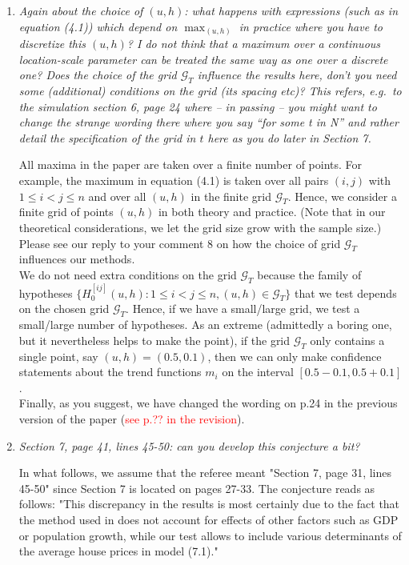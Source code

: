 \documentclass[a4paper,12pt]{article}
\begin{document}
\begin{enumerate}[label=\arabic*.,leftmargin=0.6cm]
\item \textit{Again about the choice of $(u, h)$: what happens with expressions (such as in equation (4.1)) which depend on $\max_{(u,h)}$ in practice where you have to discretize this $(u, h)$? I do not think that a maximum over a continuous location-scale parameter can be treated the same way as one over a discrete one? Does the choice of the grid $\mathcal{G}_T$ influence the results here, don't you need some (additional) conditions on the grid (its spacing etc)? This refers, e.g.\ to the simulation section 6, page 24 where -- in passing -- you might want to change the strange wording there where you say ``for some t in N'' and rather detail the specification of the grid in $t$ here as you do later in Section 7.}  

All maxima in the paper are taken over a finite number of points. For example, the maximum in equation (4.1) is taken over all pairs $(i,j)$ with $1 \le i < j \le n$ and over all $(u,h)$ in the finite grid $\mathcal{G}_T$. Hence, we consider a finite grid of points $(u,h)$ in both theory and practice. (Note that in our theoretical considerations, we let the grid size grow with the sample size.) \\
Please see our reply to your comment 8 on how the choice of grid $\mathcal{G}_T$ influences our methods. \\
We do not need extra conditions on the grid $\mathcal{G}_T$ because the family of hypotheses $\{H_0^{[ij]}(u,h): 1 \le i < j \le n, (u,h) \in \mathcal{G}_T \}$ that we test depends on the chosen grid $\mathcal{G}_T$. Hence, if we have a small/large grid, we test a small/large number of hypotheses. As an extreme (admittedly a boring one, but it nevertheless helps to make the point), if the grid $\mathcal{G}_T$ only contains a single point, say $(u,h) = (0.5, 0.1)$, then we can only make confidence statements about the trend functions $m_i$ on the interval $[0.5-0.1,0.5+0.1]$. \\
Finally, as you suggest, we have changed the wording on p.24 in the previous version of the paper (\textcolor{red}{see p.?? in the revision}). 


\item \textit{Section 7, page 41, lines 45-50: can you develop this conjecture a bit?}

In what follows, we assume that the referee meant "Section 7, page 31, lines 45-50" since Section 7 is located on pages 27-33. The conjecture reads as follows: "This discrepancy in the results is most certainly due to the fact that the method used in \cite{Knoll2017} does not account for effects of other factors such as GDP or population growth, while our test allows to include various determinants of the average house prices in model (7.1)."


\end{enumerate}
\end{document}
